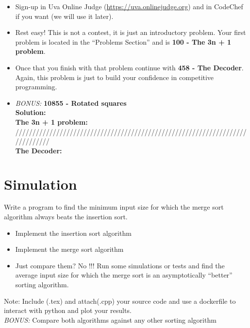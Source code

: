 \documentclass[12pt]{article}
\begin{document}
\begin{itemize}
    \item Sign-up in Uva Online Judge (\url{https://uva.onlinejudge.org}) and in CodeChef if you want (we will use it later).
    \item Rest easy! This is not a contest, it is just an introductory problem. Your first problem is located in the ``Problems Section'' and is \textbf{100 - The 3n + 1 problem}.
    
    \item Once that you finish with that problem continue with \textbf{458 - The Decoder}. Again, this problem is just to build your confidence in competitive programming.
    
    \item \emph{BONUS:} \textbf{10855 - Rotated squares}\\
    
\textbf{Solution:}\\
\textbf{The 3n + 1 problem:}\\

////////////////////////////////////////////////////////////////////////////// \\
\textbf{The Decoder:}\\

    
\end{itemize}

\section{Simulation}

Write a program to find the minimum input size for which the merge sort algorithm always beats the insertion sort.

\begin{itemize}
    \item Implement the insertion sort algorithm
    \item Implement the merge sort algorithm
    \item Just compare them? No !!! Run some simulations or tests and find the average input size for which the merge sort is an asymptotically ``better'' sorting algorithm.
\end{itemize}

Note: Include (.tex) and attach(.cpp) your source code and use a dockerfile to interact with python and plot your results.\\

\emph{BONUS:} Compare both algorithms against any other sorting algorithm
\end{document}

